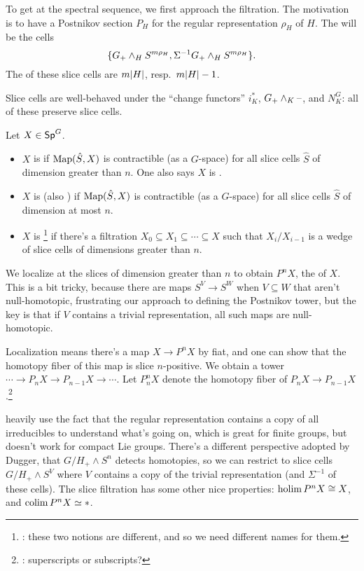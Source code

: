To get at the spectral sequence, we first approach the filtration. The motivation is to have a Postnikov section
$P_H$ for the regular representation $\rho_H$ of $H$. The  will be the cells
\[\{G_+\wedge_H S^{m\rho_H}, \Sigma^{-1}G_+\wedge_H S^{m\rho_H}\}.\]
The  of these slice cells are $m\lvert H\rvert$, resp.\ $m\lvert H\rvert - 1$.

Slice cells are well-behaved under the ``change functors'' $i_K^*$, $G_+\wedge_K\text{--}$, and $N_K^G$: all of these
preserve slice cells.
\begin{defn}
Let $X\in\mathsf{Sp}^G$.
\begin{itemize}
	\item $X$ is  if $\operatorname{Map}(\hat S, X)$ is contractible (as a $G$-space) for all slice
	cells $\hat S$ of dimension greater than $n$. One also says $X$ is .
	\item $X$ is  (also ) if $\operatorname{Map}(\hat S, X)$ is contractible (as
	a $G$-space) for all slice cells $\hat S$ of dimension at most $n$.
	\item $X$ is \footnote{\TODO: these two notions are different, and so we need
	different names for them.} if there's a filtration $X_0\subseteq X_1\subseteq\dotsb\subseteq X$ such that
	$X_i/X_{i-1}$ is a wedge of slice cells of dimensions greater than $n$.
\end{itemize}
\end{defn}
We localize at the slices of dimension greater than $n$ to obtain $P^nX$, the  of $X$. This is a
bit tricky, because there are maps $S^V\to S^W$ when $V\subseteq W$ that aren't null-homotopic, frustrating our
approach to defining the Postnikov tower, but the key is that if $V$ contains a trivial representation, all such
maps are null-homotopic.

Localization means there's a map $X\to P^nX$ by fiat, and one can show that the homotopy fiber of this map is slice
$n$-positive. We obtain a tower $\dotsb\to P_nX\to P_{n-1}X\to \dotsb$. Let $P_n^nX$ denote the homotopy fiber of
$P_nX\to P_{n-1}X$.\footnote{\TODO: superscripts or subscripts?}

\cite{HHR} heavily use the fact that the regular
representation contains a copy of all irreducibles to understand what's going on, which is great for finite groups,
but doesn't work for compact Lie groups. There's a different perspective adopted by Dugger, that $G/H_+\wedge S^n$
detects homotopies, so we can restrict to slice cells $G/H_+\wedge S^V$ where $V$ contains a copy of the trivial
representation (and $\Sigma^{-1}$ of these cells). The slice filtration has some other nice properties: $\operatorname*{holim}
P^nX\cong X$, and $\operatorname*{colim} P^nX\simeq *$.

